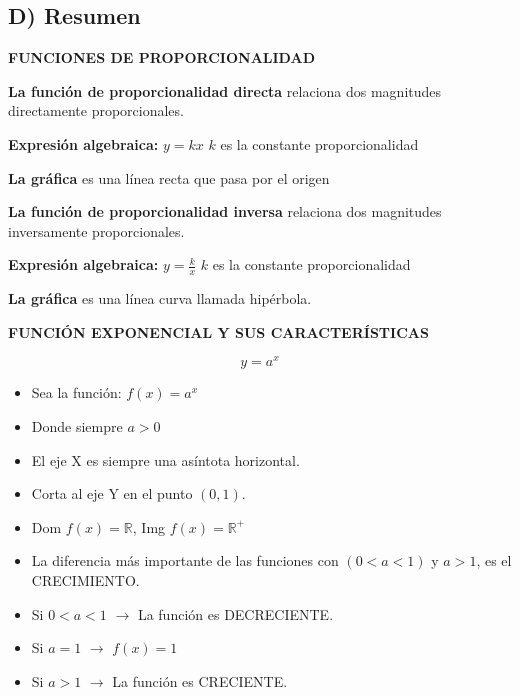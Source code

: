\documentclass[12pt,a4paper]{article}
\begin{document}
\vspace{5mm}


\subsection*{D) Resumen}

\begin{center}
\textbf{FUNCIONES DE PROPORCIONALIDAD}
\end{center}

\begin{tcolorbox}[colback=fondoazul,colframe=azuloscuro]

\textbf{La función de proporcionalidad directa} relaciona dos magnitudes directamente proporcionales.

\textbf{Expresión algebraica:} $y = kx$ \quad $k$ es la constante proporcionalidad

\textbf{La gráfica} es una línea recta que pasa por el origen

\vspace{0.5cm}

\textbf{La función de proporcionalidad inversa} relaciona dos magnitudes inversamente proporcionales.

\textbf{Expresión algebraica:} $y = \frac{k}{x}$ \quad $k$ es la constante proporcionalidad

\textbf{La gráfica} es una línea curva llamada hipérbola.

\end{tcolorbox}

\vspace{1cm}

\begin{center}
\textbf{FUNCIÓN EXPONENCIAL Y SUS CARACTERÍSTICAS}

$$y = a^x$$
\end{center}

\begin{tcolorbox}[colback=fondoazul,colframe=azuloscuro]

\begin{itemize}
\item Sea la función: $f(x) = a^x$
\item Donde siempre $a > 0$
\item El eje X es siempre una asíntota horizontal.
\item Corta al eje Y en el punto $(0,1)$.
\item Dom $f(x) = \mathbb{R}$, \quad Img $f(x) = \mathbb{R}^+$
\item La diferencia más importante de las funciones con $(0 < a < 1)$ y $a > 1$, es el CRECIMIENTO.
\item Si $0 < a < 1$ $\rightarrow$ La función es DECRECIENTE.
\item Si $a = 1$ $\rightarrow$ $f(x) = 1$
\item Si $a > 1$ $\rightarrow$ La función es CRECIENTE.
\end{itemize}

\end{tcolorbox}
\end{document}
